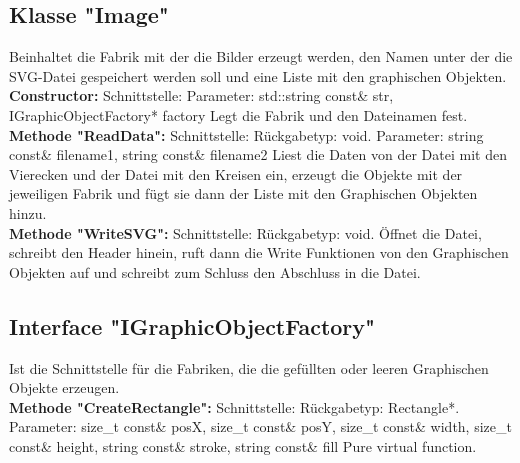 \documentclass[12pt,a4paper]{article}
\begin{document}
\subsection {Klasse "Image"}
Beinhaltet die Fabrik mit der die Bilder erzeugt werden, den Namen unter der die SVG-Datei gespeichert werden soll und eine Liste mit den graphischen Objekten.
\\

\textbf {Constructor: } 
\newline
Schnittstelle: 
Parameter: std::string const\& str, IGraphicObjectFactory* factory
\newline
Legt die Fabrik und den Dateinamen fest.
\\

\textbf {Methode "ReadData": } 
\newline
Schnittstelle:
\newline
Rückgabetyp: void.
\newline
Parameter: string const\& filename1, string const\& filename2
\newline
Liest die Daten von der Datei mit den Vierecken und der Datei mit den Kreisen ein, erzeugt die Objekte mit der jeweiligen Fabrik und fügt sie dann der Liste mit den Graphischen Objekten hinzu.
\\

\textbf {Methode "WriteSVG": } 
\newline
Schnittstelle: 
\newline
Rückgabetyp: void.
\newline
Öffnet die Datei, schreibt den Header hinein, ruft dann die Write Funktionen von den Graphischen Objekten auf und schreibt zum Schluss den Abschluss in die Datei.
\\


\subsection {Interface "IGraphicObjectFactory"}
Ist die Schnittstelle für die Fabriken, die die gefüllten oder leeren Graphischen Objekte erzeugen.
\\

\textbf {Methode "CreateRectangle": } 
\newline
Schnittstelle: 
\newline
Rückgabetyp: Rectangle*.
\newline
Parameter: size\_t const\& posX, size\_t const\& posY, size\_t const\& width, size\_t const\& height, string const\& stroke, string const\& fill
\newline
Pure virtual function.
\\
\end{document}
